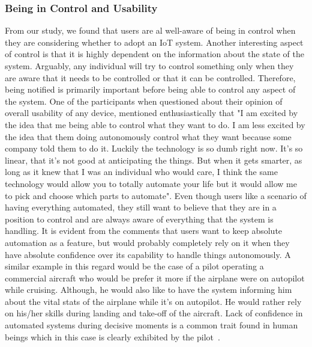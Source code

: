 \subsubsection{Being in Control and Usability}
From our study, we found that users are al well-aware of being in control when they are considering whether to adopt an IoT system. Another interesting aspect of control is that it is highly dependent on the information about the state of the system. Arguably, any individual will try to control something only when they are aware that it needs to be controlled or that it can be controlled. Therefore, being notified is primarily important before being able to control any aspect of the system. One of the participants when questioned about their opinion of overall usability of any device, mentioned enthusiastically that "I am excited by the idea that me being able to control what they want to do. I am less excited by the idea that them doing autonomously control what they want because some company told them to do it. Luckily the technology is so dumb right now. It's so linear, that it's not good at anticipating the things. But when it gets smarter, as long as it knew that I was an individual who would care, I think the same technology would allow you to totally automate your life but it would allow me to pick and choose which parts to automate". Even though users like a scenario of having everything automated, they still want to believe that they are in a position to control and are always aware of everything that the system is handling. It is evident from the comments that users want to keep absolute automation as a feature, but would probably completely rely on it when they have absolute confidence over its capability to handle things autonomously. A similar example in this regard would be the case of a pilot operating a commercial aircraft who would be prefer it more if the airplane were on autopilot while cruising. Although, he would also like to have the system informing him about the vital stats of the airplane while it's on autopilot. He would rather rely on his/her skills during landing and take-off of the aircraft. Lack of confidence in automated systems during decisive moments is a common trait found in human beings which in this case is clearly exhibited by the pilot~\cite{namara2018potential}.

